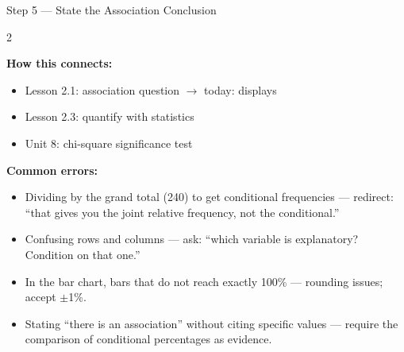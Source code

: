 \documentclass[10pt]{article}
\begin{document}
\vspace{0.1in}

\begin{notesbox}{Step 5 --- State the Association Conclusion}
\small


\end{notesbox}

\vspace{0.1in}

\begin{spiralbox}
\small
\begin{multicols}{2}

\textbf{How this connects:}
\begin{itemize}[itemsep=3pt]
  \item Lesson 2.1: association question $\to$ today: displays
  \item Lesson 2.3: quantify with statistics
  \item Unit 8: chi-square significance test
\end{itemize}

\columnbreak


\end{multicols}
\end{spiralbox}

\begin{teachernote}
\textbf{Common errors:}
\begin{itemize}[itemsep=3pt]
  \item Dividing by the grand total (240) to get conditional frequencies --- redirect: ``that gives you the joint relative frequency, not the conditional.''
  \item Confusing rows and columns --- ask: ``which variable is explanatory? Condition on that one.''
  \item In the bar chart, bars that do not reach exactly 100\% --- rounding issues; accept $\pm$1\%.
  \item Stating ``there is an association'' without citing specific values --- require the comparison of conditional percentages as evidence.
\end{itemize}
\end{teachernote}
\end{document}
